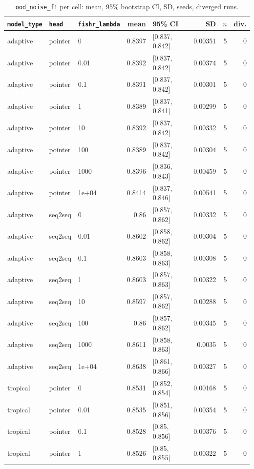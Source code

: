 \documentclass[10pt]{article}
\begin{document}
{\small
\begin{longtable}{lllrlrrr}
\caption{\texttt{ood\_noise\_f1} per cell: mean, 95\% bootstrap CI, SD, seeds, diverged runs.}\label{tab:summary-ood_noise_f1}\\
\toprule
\texttt{model\_type} & \texttt{head} & \texttt{fishr\_lambda} & mean & 95\% CI & SD & $n$ & div.\\
\midrule
\endhead
adaptive & pointer & 0 & 0.8397 & [0.837, 0.842] & 0.00351 & 5 & 0\\
adaptive & pointer & 0.01 & 0.8392 & [0.837, 0.842] & 0.00374 & 5 & 0\\
adaptive & pointer & 0.1 & 0.8391 & [0.837, 0.842] & 0.00301 & 5 & 0\\
adaptive & pointer & 1 & 0.8389 & [0.837, 0.841] & 0.00299 & 5 & 0\\
adaptive & pointer & 10 & 0.8392 & [0.837, 0.842] & 0.00332 & 5 & 0\\
adaptive & pointer & 100 & 0.8389 & [0.837, 0.842] & 0.00304 & 5 & 0\\
adaptive & pointer & 1000 & 0.8396 & [0.836, 0.843] & 0.00459 & 5 & 0\\
adaptive & pointer & 1e+04 & 0.8414 & [0.837, 0.846] & 0.00541 & 5 & 0\\
adaptive & seq2seq & 0 & 0.86 & [0.857, 0.862] & 0.00332 & 5 & 0\\
adaptive & seq2seq & 0.01 & 0.8602 & [0.858, 0.862] & 0.00304 & 5 & 0\\
adaptive & seq2seq & 0.1 & 0.8603 & [0.858, 0.863] & 0.00308 & 5 & 0\\
adaptive & seq2seq & 1 & 0.8603 & [0.857, 0.863] & 0.00322 & 5 & 0\\
adaptive & seq2seq & 10 & 0.8597 & [0.857, 0.862] & 0.00288 & 5 & 0\\
adaptive & seq2seq & 100 & 0.86 & [0.857, 0.862] & 0.00345 & 5 & 0\\
adaptive & seq2seq & 1000 & 0.8611 & [0.858, 0.863] & 0.0035 & 5 & 0\\
adaptive & seq2seq & 1e+04 & 0.8638 & [0.861, 0.866] & 0.00327 & 5 & 0\\
tropical & pointer & 0 & 0.8531 & [0.852, 0.854] & 0.00168 & 5 & 0\\
tropical & pointer & 0.01 & 0.8535 & [0.851, 0.856] & 0.00354 & 5 & 0\\
tropical & pointer & 0.1 & 0.8528 & [0.85, 0.856] & 0.00376 & 5 & 0\\
tropical & pointer & 1 & 0.8526 & [0.85, 0.855] & 0.00322 & 5 & 0\\

\end{longtable}}
\end{document}
